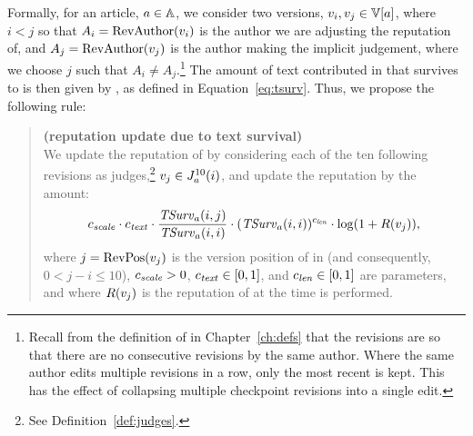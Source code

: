 Formally, for an article, $a \in \mathbb{A}$,
we consider two versions, $\version{i}, \version{j} \in \versions{a}$,
where $i < j$ so that $A_i = \mathrm{RevAuthor}(v_{i})$ is the author we are
adjusting the reputation of, and $A_j = \mathrm{RevAuthor}(v_{j})$ is the author
making the implicit judgement, where we choose $j$ such that $A_i \not = A_j$.\footnote{Recall
from the definition of \versions{\article{}} in Chapter~\ref{ch:defs}
that the revisions are  so that there are no consecutive
revisions by the same author.
Where the same author edits multiple revisions in a row, only the
most recent is kept.  This has the effect of collapsing multiple
checkpoint revisions into a single edit.}
The amount of text contributed in  that survives
to  is then given by , as defined in
Equation~\ref{eq:tsurv}.
Thus, we propose the following rule:

\begin{quote}
  \begin{regola}
  \textbf{(reputation update due to text survival)} \\
  \label{rule-text}
    We update the reputation of  by considering
    each of the ten following revisions as judges,\footnote{See
    Definition~\ref{def:judges}.}
    $v_j \in J_{a}^{10}(i)$, and update the reputation by the amount:
    \[
      {c_{{\text{\textit{scale}}}}} \cdot {c_{{\text{\textit{text}}}}} \cdot \frac{\mathit{TSurv}_{a}(i,j)}{\mathit{TSurv}_{a}(i,i)}
      \cdot (\mathit{TSurv}_{a}(i,i))^{c_{{\text{\textit{len}}}}} \cdot \log(1 + R(v_{j})),
    \]
    where $j = \mathrm{RevPos}(v_{j})$ is the version position of 
    in  (and consequently, $0 < j - i \le 10$),
    ${c_{{\text{\textit{scale}}}}} > 0$, ${c_{{\text{\textit{text}}}}} \in [0,1]$, and ${c_{{\text{\textit{len}}}}} \in
    [0,1]$ are parameters, and where $R(v_{j})$ is the reputation of
     at the time  is performed.
  \end{regola}
\end{quote}

